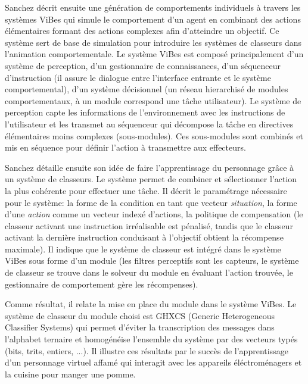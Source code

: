 \documentclass[11pt]{article}
\begin{document}
Sanchez décrit ensuite une génération de comportements individuels à travers les systèmes ViBes qui simule le comportement d'un agent en combinant des actions élémentaires formant des actions complexes afin d'atteindre un objectif. Ce système sert de base de simulation pour introduire les systèmes de classeurs dans l'animation comportementale. Le système ViBes est composé principalement d'un système de perception, d'un gestionnaire de connaissances, d'un séquenceur d'instruction (il assure le dialogue entre l'interface entrante et le système comportemental), d'un système décisionnel (un réseau hierarchisé de modules comportementaux, à un module correspond une tâche utilisateur). Le système de perception capte les informations de l'environnement avec les instructions de l'utilisateur et les transmet au séquenceur qui décompose la tâche en directives élémentaires moins complexes (sous-modules). Ces sous-modules sont combinés et mis en séquence pour définir l'action à transmettre aux effecteurs.

Sanchez détaille ensuite son idée de faire l'apprentissage du personnage grâce à un système de classeurs. Le système permet de combiner et sélectionner l'action la plus cohérente pour effectuer une tâche. Il décrit le paramétrage nécessaire pour le système: la forme de la condition en tant que vecteur \textit{situation}, la forme d'une \textit{action} comme un vecteur indexé d'actions, la politique de compensation (le classeur activant une instruction irréalisable est pénalisé, tandis que le classeur activant la dernière instruction conduisant à l'objectif obtient la récompense maximale). Il indique que le système de classeur est intégré dans le système ViBes sous forme d'un module (les filtres perceptifs sont les capteurs, le système de classeur se trouve dans le solveur du module en évaluant l'action trouvée, le gestionnaire de comportement gère les récompenses).

Comme résultat, il relate la mise en place du module dans le système ViBes. Le système de classeur du module choisi est GHXCS (Generic Heterogeneous Classifier Systems) qui permet d'éviter la transcription des messages dans l'alphabet ternaire et homogénéise l'ensemble du système par des vecteurs typés (bits, trits, entiers, ...). Il illustre ces résultats par le succès de l'apprentissage d'un personnage virtuel affamé qui interagit avec les appareils éléctroménagers et la cuisine pour manger une pomme. 
\end{document}
